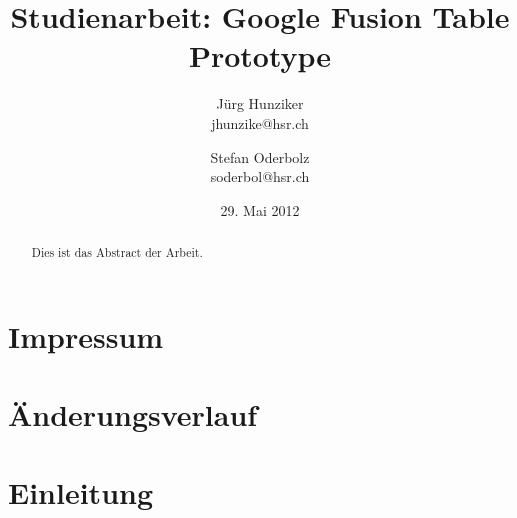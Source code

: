 


\title{Studienarbeit: Google Fusion Table Prototype}
\author{Jürg Hunziker\\jhunzike@hsr.ch
		\and
		Stefan Oderbolz\\soderbol@hsr.ch}

\date{29. Mai 2012}
\maketitle

\chapter*{Impressum}


\chapter*{Änderungsverlauf}


\begin{abstract}
Dies ist das Abstract der Arbeit.
\end{abstract}

\tableofcontents

\chapter{Einleitung}
\label{chp:einleitung}


